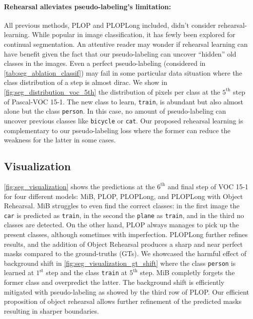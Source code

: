 \paragraph{Rehearsal alleviates pseudo-labeling's limitation:} All previous methods, PLOP
and PLOPLong included, didn't consider rehearsal-learning. While popular in image classification, it
has fewly been explored for continual segmentation. An attentive reader may wonder if rehearsal
learning can have benefit given the fact that our pseudo-labeling can uncover ``hidden'' old classes
in the images. Even a perfect pseudo-labeling (considered in \autoref{tab:seg_ablation_classif}) may
fail in some particular data situation where the class distribution of a step is almost dirac. We
show in \autoref{fig:seg_distribution_voc_5th} the distribution of pixels per class at the
$5^{\text{th}}$ step of Pascal-VOC 15-1. The new class to learn, \texttt{train}, is abundant but
also almost alone but the class \texttt{person}. In this case, no amount of pseudo-labeling can
uncover previous classes like \texttt{bicycle} or \texttt{cat}. Our proposed rehearsal learning is
complementary to our pseudo-labeling loss where the former can reduce the weakness for the latter in
some cases.

\subsection{Visualization}

\autoref{fig:seg_visualization} shows the predictions at the $6^\text{th}$ and final step of VOC
15-1 for four different models: MiB, PLOP, PLOPLong, and PLOPLong with Object Rehearsal. MiB
struggles to even find the correct classes: in the first image the \texttt{car} is predicted as
\texttt{train}, in the second the \texttt{plane} as \texttt{train}, and in the third no classes are
detected. On the other hand, PLOP always manages to pick up the present classes, although sometimes
with imperfection. PLOPLong further refines results, and the addition of Object Rehearsal produces a
sharp and near perfect masks compared to the ground-truths (GTs). We showcased the harmful effect of
background shift in \autoref{fig:seg_visualization_gt_shift} where the class \texttt{person} is
learned at $1^\text{st}$ step and the class \texttt{train} at $5^\text{th}$ step. MiB completly
forgets the former class and overpredict the latter. The background shift is efficiently mitigated
with pseudo-labeling as showed by the third row of PLOP. Our efficient proposition of object
rehearsal allows further refinement of the predicted masks resulting in sharper boundaries.


